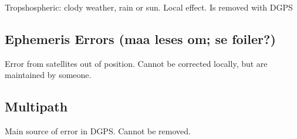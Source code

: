 Tropshospheric: clody weather, rain or sun. Local effect. Is removed with DGPS
\subsection{Ephemeris Errors (maa leses om; se foiler?)}
Error from satellites out of position. Cannot be corrected locally, but are maintained by someone.
\subsection{Multipath}
Main source of error in DGPS. Cannot be removed. 
\cleardoublepage